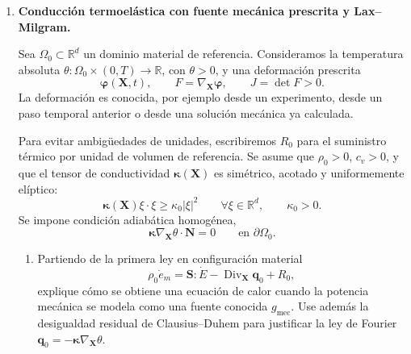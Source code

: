 \documentclass[11pt]{article}
\newcommand{\R}{\mathbb{R}}
\DeclareMathOperator{\diver}{div}
\DeclareMathOperator{\Div}{Div}
\begin{document}
\begin{enumerate}[label=\textbf{\arabic*.}, leftmargin=*]
\begin{enumerate}[label=(\alph*), leftmargin=*]
    \item Asuma la condici\'on inf--sup continua de la divergencia
    \begin{equation*}
        \inf_{q\in L^2_0(\Omega)\setminus\{0\}}
        \sup_{\bm w\in H^1_0(\Omega)^d\setminus\{\bm 0\}}
        \frac{\int_\Omega q\,\diver\bm w\,dx}
        {\|q\|_{L^2(\Omega)}\|\bm w\|_{H^1(\Omega)}}
        \ge \beta>0.
    \end{equation*}
    Verifique las hip\'otesis necesarias del teorema de Ne\v{c}as--Babu\v{s}ka--Brezzi para concluir existencia, unicidad y una estimaci\'on de estabilidad para $(\bm v,p)$.
\end{enumerate}

\item \textbf{Conducci\'on termoel\'astica con fuente mec\'anica prescrita y Lax--Milgram.}

Sea $\Omega_0\subset\R^d$ un dominio material de referencia. Consideramos la temperatura absoluta $\theta:\Omega_0\times(0,T)\to\R$, con $\theta>0$, y una deformaci\'on prescrita
\begin{equation*}
    \bm\varphi(\bm X,t),
    \qquad
    F=\nabla_{\bm X}\bm\varphi,
    \qquad
    J=\det F>0.
\end{equation*}
La deformaci\'on es conocida, por ejemplo desde un experimento, desde un paso temporal anterior o desde una soluci\'on mec\'anica ya calculada.

Para evitar ambig\"uedades de unidades, escribiremos $R_0$ para el suministro t\'ermico por unidad de volumen de referencia. Se asume que $\rho_0>0$, $c_v>0$, y que el tensor de conductividad $\bm\kappa(\bm X)$ es sim\'etrico, acotado y uniformemente el\'iptico:
\begin{equation*}
    \bm\kappa(\bm X)\xi\cdot\xi\ge \kappa_0|\xi|^2
    \qquad\forall \xi\in\R^d,
    \qquad
    \kappa_0>0.
\end{equation*}
Se impone condici\'on adiab\'atica homog\'enea,
\begin{equation*}
    \bm\kappa\nabla_{\bm X}\theta\cdot\bm N=0
    \qquad\text{en }\partial\Omega_0.
\end{equation*}

\begin{enumerate}[label=(\alph*), leftmargin=*]
    \item Partiendo de la primera ley en configuraci\'on material
    \begin{equation*}
        \rho_0\dot e_m=\bm S:\dot E-\Div_{\bm X}\bm q_0+R_0,
    \end{equation*}
    explique c\'omo se obtiene una ecuaci\'on de calor cuando la potencia mec\'anica se modela como una fuente conocida $g_{\mathrm{mec}}$. Use adem\'as la desigualdad residual de Clausius--Duhem para justificar la ley de Fourier $\bm q_0=-\bm\kappa\nabla_{\bm X}\theta$.


\end{enumerate}
\end{enumerate}
\end{document}
